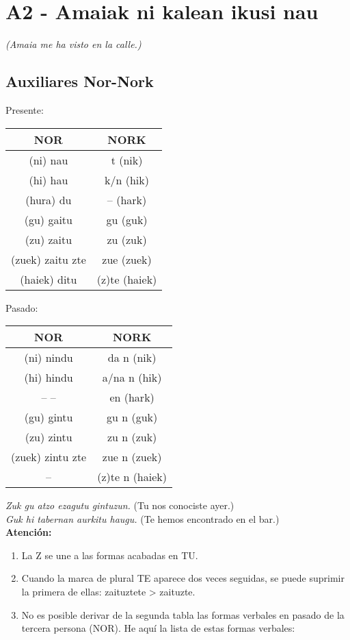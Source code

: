 \documentclass[11pt, a4paper]{article}
\begin{document}
\newpage
\section{A2 - Amaiak ni kalean ikusi nau}
\indent \indent \textit{(Amaia me ha visto en la calle.)}\\

\subsection{Auxiliares Nor-Nork}
\begin{table}[h]
\centering
Presente:
\begin{tabular}{cc}
\hline
NOR & NORK\\
\hline
(ni) nau&t (nik)\\
(hi) hau&k/n (hik)\\
(hura) du&– (hark)\\
(gu) gaitu&gu (guk)\\
(zu) zaitu&zu (zuk)\\
(zuek) zaitu zte&zue (zuek)\\
(haiek) ditu&(z)te (haiek)
\end{tabular}
\end{table}

\begin{table}[h]
\centering
Pasado:
\begin{tabular}{cc}
\hline
NOR & NORK\\
\hline
(ni) nindu&da n (nik)\\
(hi) hindu&a/na n (hik)\\
– –&en (hark)\\
(gu) gintu&gu n (guk)\\
(zu) zintu&zu n (zuk)\\
(zuek) zintu zte&zue n (zuek)\\
–&(z)te n (haiek)
\end{tabular}
\end{table}

\indent \textit{Zuk gu atzo ezagutu gintuzun.} (Tu nos conociste ayer.)\\
\indent \textit{Guk hi tabernan aurkitu haugu.} (Te hemos encontrado en el bar.)\\

\noindent \textbf{Atención:}
\begin{enumerate}
\item La Z se une a las formas acabadas en TU.
\item Cuando la marca de plural TE aparece dos veces seguidas, se puede suprimir la primera de ellas: zaituztete > zaituzte.
\item No es posible derivar de la segunda tabla las formas verbales en pasado de la tercera persona (NOR). He aquí la lista de estas formas verbales:
\end{enumerate}
\end{document}
